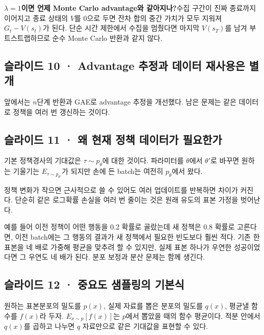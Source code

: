 \documentclass[11pt,a4paper]{article}
\begin{document}
\par\medskip\noindent\textbf{$\lambda=1$이면 언제 Monte Carlo advantage와 같아지나?}\quad 수집 구간이 진짜 종료까지 이어지고 종료 상태의 $V$를 0으로 두면 잔차 합의 중간 가치가 모두 지워져 $G_t-V(s_t)$가 된다. 단순 시간 제한에서 수집을 멈췄다면 마지막 $V(s_T)$를 남겨 부트스트랩하므로 순수 Monte Carlo 반환과 같지 않다.\par

\subsection{슬라이드 10 · Advantage 추정과 데이터 재사용은 별개}

앞에서는 $n$단계 반환과 GAE로 advantage 추정을 개선했다. 남은 문제는 같은 데이터로 정책을 여러 번 갱신하는 것이다.\par

\subsection{슬라이드 11 · 왜 현재 정책 데이터가 필요한가}

기본 정책경사의 기대값은 $\tau\sim p_\theta$에 대한 것이다. 파라미터를 $\theta$에서 $\theta'$로 바꾸면 원하는 기울기는 $E_{\tau\sim p_{\theta'}}$가 되지만 손에 든 batch는 여전히 $p_\theta$에서 왔다.\par

정책 변화가 작으면 근사적으로 쓸 수 있어도 여러 업데이트를 반복하면 차이가 커진다. 단순히 같은 로그확률 손실을 여러 번 줄이는 것은 원래 유도의 표본 가정을 벗어난다.\par

예를 들어 이전 정책이 어떤 행동을 0.2 확률로 골랐는데 새 정책은 0.8 확률로 고른다면, 이전 batch에는 그 행동의 결과가 새 정책에서 필요한 빈도보다 훨씬 적다. 기존 한 표본을 네 배로 가중해 평균을 맞추려 할 수 있지만, 실제 표본 하나가 우연한 성공이었다면 그 우연도 네 배가 된다. 분포 보정과 분산 문제는 함께 생긴다.\par

\subsection{슬라이드 12 · 중요도 샘플링의 기본식}

원하는 표본분포의 밀도를 $p(x)$, 실제 자료를 뽑은 분포의 밀도를 $q(x)$, 평균낼 함수를 $f(x)$라 두자. $E_{x\sim p}[f(x)]$는 $p$에서 뽑았을 때의 함수 평균이다. 적분 안에서 $q(x)$를 곱하고 나누면 $q$ 자료만으로 같은 기대값을 표현할 수 있다.\par
\end{document}
